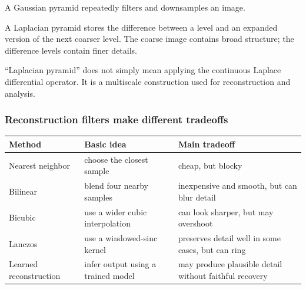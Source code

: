 A Gaussian pyramid repeatedly filters and downsamples an image.

A Laplacian pyramid stores the difference between a level and an expanded version of the next coarser level. The coarse image contains broad structure; the difference levels contain finer details.

``Laplacian pyramid'' does not simply mean applying the continuous Laplace differential operator. It is a multiscale construction used for reconstruction and analysis.

\subsubsection{Reconstruction filters make different tradeoffs}\label{04-visual-computing-ii-ch043-reconstruction-filters-make-different-tradeoffs}

\hypertarget{04-visual-computing-ii-ch043-reconstruction-filters-make-different-tradeoffs}{}

{\def\LTcaptype{none} %
\begin{longtable}[]{@{}
  >{\raggedright\arraybackslash}p{}
  >{\raggedright\arraybackslash}p{}
  >{\raggedright\arraybackslash}p{}@{}}
\toprule\noalign{}
\begin{minipage}[b]{\linewidth}\raggedright
Method
\end{minipage} & \begin{minipage}[b]{\linewidth}\raggedright
Basic idea
\end{minipage} & \begin{minipage}[b]{\linewidth}\raggedright
Main tradeoff
\end{minipage} \\
\midrule\noalign{}
\endhead
\bottomrule\noalign{}
\endlastfoot
Nearest neighbor & choose the closest sample & cheap, but blocky \\
Bilinear & blend four nearby samples & inexpensive and smooth, but can blur detail \\
Bicubic & use a wider cubic interpolation & can look sharper, but may overshoot \\
Lanczos & use a windowed-sinc kernel & preserves detail well in some cases, but can ring \\
Learned reconstruction & infer output using a trained model & may produce plausible detail without faithful recovery \\
\end{longtable}
}

